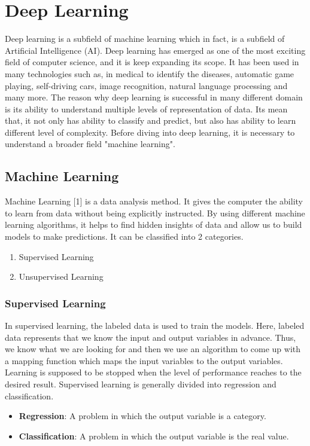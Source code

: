 \chapter{Deep Learning}

Deep learning is a subfield of machine learning which in fact, is a subfield of Artificial Intelligence (AI). Deep learning has emerged as one of the most exciting field of computer science, and it is keep expanding its scope. It has been used in many technologies such as, in medical to identify the diseases, automatic game playing, self-driving cars, image recognition, natural language processing and many more. The reason why deep learning is successful in many different domain is its ability to understand multiple levels of representation of data. Its mean that, it not only has ability to classify and predict, but also has ability to learn different level of complexity. Before diving into deep learning, it is necessary to understand a broader field "machine learning".

\section{Machine Learning}

Machine Learning [1] is a data analysis method. It gives the computer the ability to learn from data without being explicitly instructed. By using different machine learning algorithms, it helps to find hidden insights of data and allow us to build models to make predictions. It can be classified into 2 categories.

\begin{enumerate}
	\item Supervised Learning
	\item Unsupervised Learning
\end{enumerate}

\subsection{Supervised Learning}

In supervised learning, the labeled data is used to train the models. Here, labeled data represents that we know the input and output variables in advance. Thus, we know what we are looking for and then we use an algorithm to come up with a mapping function which maps the input variables to the output variables. Learning is supposed to be stopped when the level of performance reaches to the desired result. Supervised learning is generally divided into regression and classification.
\begin{itemize}
	\item \textbf{Regression}: A problem in which the output variable is a category.
	\item \textbf{Classification}: A problem in which the output variable is the real value.
\end{itemize}


